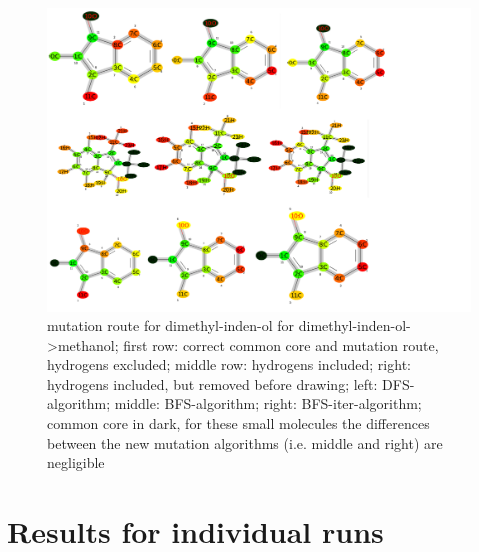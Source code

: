 \begin{figure}[H]
	
	\includegraphics[scale=0.75]{dimethylindenol_set2}\caption{mutation route for dimethyl-inden-ol for dimethyl-inden-ol->methanol; first row: correct common core and mutation route, hydrogens excluded; middle row: hydrogens included; right: hydrogens included, but removed before drawing; left: DFS-algorithm; middle: BFS-algorithm; right: BFS-iter-algorithm; common core in dark, for these small molecules the differences between the new mutation algorithms (i.e. middle and right) are negligible}
	
\end{figure}





\section{Results for individual runs}

